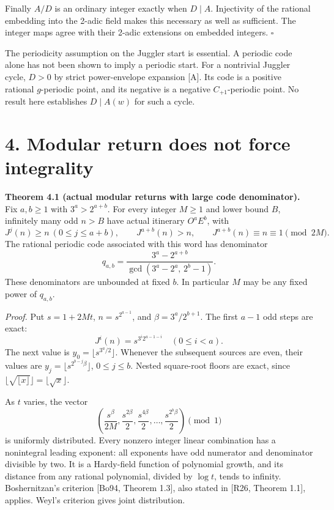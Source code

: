 \documentclass[11pt,a4paper]{article}
\begin{document}
Finally \(A/D\) is an ordinary integer exactly when \(D\mid A\).
Injectivity of the rational embedding into the 2-adic field makes this
necessary as well as sufficient. The integer maps agree with their
2-adic extensions on embedded integers. \(\square\)

The periodicity assumption on the Juggler start is essential. A periodic
code alone has not been shown to imply a periodic start. For a
nontrivial Juggler cycle, \(D>0\) by strict power-envelope expansion
{[}A{]}. Its code is a positive rational \(g\)-periodic point, and its
negative is a negative \(C_{+1}\)-periodic point. No result here
establishes \(D\mid A(w)\) for such a cycle.

\section{4. Modular return does not force
integrality}\label{modular-return-does-not-force-integrality}

\textbf{Theorem 4.1 (actual modular returns with large code
denominator).} Fix \(a,b\ge1\) with \(3^a>2^{a+b}\). For every integer
\(M\ge1\) and lower bound \(B\), infinitely many odd \(n>B\) have actual
itinerary \(O^aE^b\), with \[
J^j(n)\ge n\ (0\le j\le a+b),\qquad J^{a+b}(n)>n,\qquad
J^{a+b}(n)\equiv n\equiv1\pmod{2M}.
\tag{4.1}
\] The rational periodic code associated with this word has denominator
\[
q_{a,b}=\frac{3^a-2^{a+b}}{\gcd(3^a-2^a,\,2^b-1)}.
\tag{4.2}
\] These denominators are unbounded at fixed \(b\). In particular \(M\)
may be any fixed power of \(q_{a,b}\).

\emph{Proof.} Put \(s=1+2Mt\), \(n=s^{2^{a-1}}\), and
\(\beta=3^a/2^{b+1}\). The first \(a-1\) odd steps are exact: \[
J^i(n)=s^{3^i2^{a-1-i}}\quad(0\le i<a).
\] The next value is \(y_0=\lfloor s^{3^a/2}\rfloor\). Whenever the
subsequent sources are even, their values are
\(y_j=\lfloor s^{2^{b-j}\beta}\rfloor\), \(0\le j\le b\). Nested
square-root floors are exact, since
\(\lfloor\sqrt{\lfloor x\rfloor}\rfloor=\lfloor\sqrt x\rfloor\).

As \(t\) varies, the vector \[
\left(\frac{s^\beta}{2M},\frac{s^{2\beta}}2,
\frac{s^{4\beta}}2,\ldots,\frac{s^{2^b\beta}}2\right)\pmod1
\tag{4.3}
\] is uniformly distributed. Every nonzero integer linear combination
has a nonintegral leading exponent: all exponents have odd numerator and
denominator divisible by two. It is a Hardy-field function of polynomial
growth, and its distance from any rational polynomial, divided by
\(\log t\), tends to infinity. Boshernitzan's criterion {[}Bo94, Theorem
1.3{]}, also stated in {[}R26, Theorem 1.1{]}, applies. Weyl's criterion
gives joint distribution.
\end{document}
